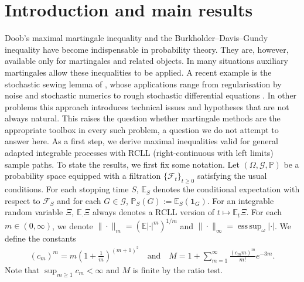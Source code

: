 \documentclass[12pt,oneside,reqno,fleqn]{amsart}
\numberwithin{equation}{section}
\theoremstyle{remark}
\newcommand\cff{{\mathcal F}}
\newcommand\cgg{{\mathcal G}}
\newcommand\mE{{\mathbb E}}
\newcommand\E{\mE}
\newcommand\PP{{\mathbb P}}
\newcommand{\tand}{\quad\text{and}\quad}
\newcommand{\1}{{\mathbf 1}}
\DeclareMathOperator*{\esssup}{ess\,sup}
\renewcommand{\ge}{\geq}
\begin{document}
\section{Introduction and main results} %
\label{sec:introduction}
	Doob's maximal martingale inequality \cite{MR0058896} and the Burkholder--Davis--Gundy inequality \cite{MR0400380} have become indispensable in probability theory. They are, however, available only for martingales and related objects.
	In many situations auxiliary martingales allow these inequalities to be applied. A recent example is the stochastic sewing lemma of \cite{le2018stochastic}, whose applications range from regularisation by noise \cite{athreya2020well} and stochastic numerics \cite{dareiotis2021quantifying,le2021taming,butkovsky2021approximation} to rough stochastic differential equations \cite{FHL21}. In other problems this approach introduces technical issues and hypotheses that are not always natural.
	This raises the question whether martingale methods are the appropriate toolbox in every such problem, a question we do not attempt to answer here. As a first step, we derive maximal inequalities valid for general adapted integrable processes with RCLL (right-continuous with left limits) sample paths.
	To state the results, we first fix some notation. Let $(\Omega,\cgg,\PP)$ be a probability space equipped with a filtration $\{\cff_t\}_{t\ge0}$ satisfying the usual conditions. 
	For each stopping time $S$, $\E_S$ denotes the conditional expectation with respect to $\cff_S$ and for each $G\in \cgg$, $\PP_S(G):=\E_S(\1_G)$. For an integrable random variable $\Xi$, $\E_\cdot \Xi$ always denotes a RCLL version of $t\mapsto \E_t \Xi$.
	For each $m\in(0,\infty)$, we denote $\|\cdot\|_m=(\E|\cdot|^m)^{1/m}$ and $\|\cdot\|_\infty=\esssup_\omega|\cdot|$.
	We define the constants
	\begin{align}\label{def.M}
	 	(c_m)^m=m\left(1+\frac1m\right)^{(m+1)^2}
	 	\tand M=1+\sum_{m=1}^\infty \frac{(c_mm)^m }{m!}e^{-3m}.
	\end{align}
	Note that  $\sup_{m\ge1}c_m<\infty$ and $M$ is finite by the ratio test.
\end{document}
